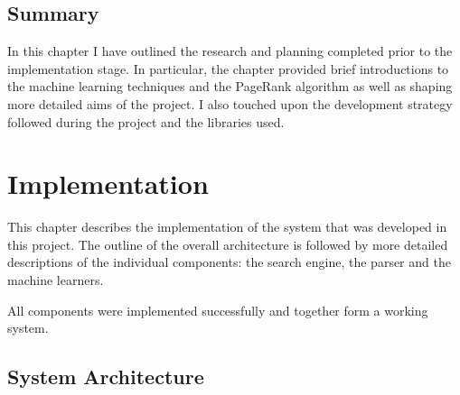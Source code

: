 \documentclass[12pt,notitlepage,twoside]{scrbook}
\begin{document}
\section{Summary}
In this chapter I have outlined the research and planning completed prior to the
implementation stage. In particular, the chapter provided brief introductions to the machine
learning techniques and the PageRank algorithm as well as shaping more detailed aims of
the project. I also touched upon the development strategy followed during the project 
and the libraries used.


\chapter{Implementation}
This chapter describes the implementation of the system that was developed in this
project. The outline of the overall architecture is followed by more detailed descriptions
of the individual components: the search engine, the parser and the machine learners.

All components were implemented successfully and together form a working system.
\section{System Architecture}
\end{document}
